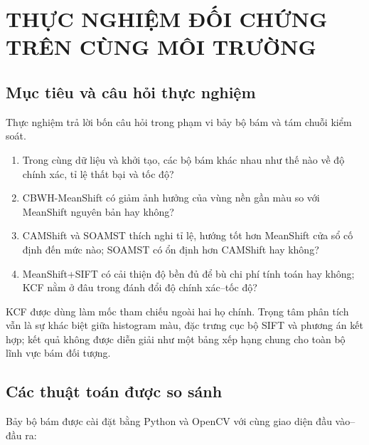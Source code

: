 \documentclass[12pt,a4paper]{article}
\numberwithin{equation}{section}
\begin{document}
\section{THỰC NGHIỆM ĐỐI CHỨNG TRÊN CÙNG MÔI TRƯỜNG}

\subsection{Mục tiêu và câu hỏi thực nghiệm}

Thực nghiệm trả lời bốn câu hỏi trong phạm vi bảy bộ bám và tám chuỗi kiểm soát.

\begin{enumerate}[label=\textbf{RQ\arabic*:},leftmargin=2.2cm]
  \item Trong cùng dữ liệu và khởi tạo, các bộ bám khác nhau như thế nào về độ chính xác,
  tỉ lệ thất bại và tốc độ?
  \item CBWH-MeanShift có giảm ảnh hưởng của vùng nền gần màu so với MeanShift nguyên bản hay không?
  \item CAMShift và SOAMST thích nghi tỉ lệ, hướng tốt hơn MeanShift cửa sổ cố định đến mức nào;
  SOAMST có ổn định hơn CAMShift hay không?
  \item MeanShift+SIFT có cải thiện độ bền đủ để bù chi phí tính toán hay không; KCF nằm ở đâu
  trong đánh đổi độ chính xác--tốc độ?
\end{enumerate}

KCF được dùng làm mốc tham chiếu ngoài hai họ chính. Trọng tâm phân tích vẫn là sự khác biệt giữa
histogram màu, đặc trưng cục bộ SIFT và phương án kết hợp; kết quả không được diễn giải như một
bảng xếp hạng chung cho toàn bộ lĩnh vực bám đối tượng.

\subsection{Các thuật toán được so sánh}

Bảy bộ bám được cài đặt bằng Python và OpenCV với cùng giao diện đầu vào--đầu ra:
\end{document}
